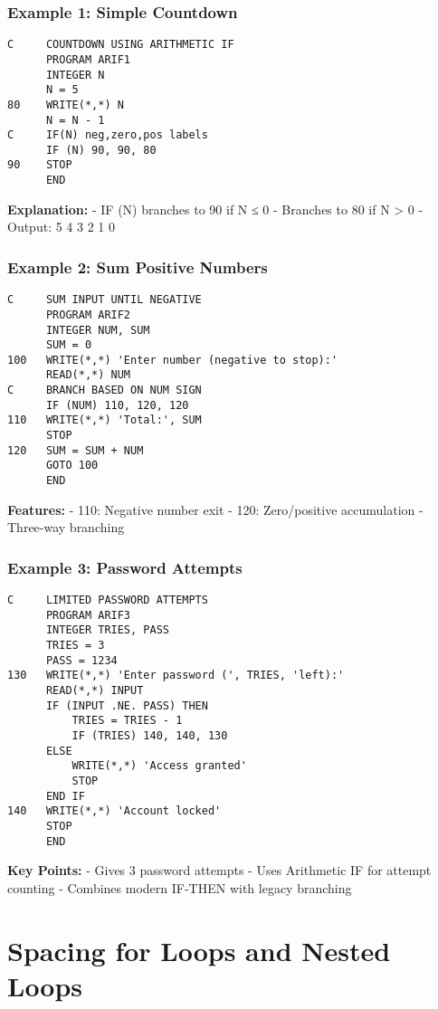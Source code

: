 \documentclass{book}
\begin{document}
\subsubsection*{Example 1: Simple Countdown}
\begin{verbatim}
C     COUNTDOWN USING ARITHMETIC IF
      PROGRAM ARIF1
      INTEGER N
      N = 5
80    WRITE(*,*) N
      N = N - 1
C     IF(N) neg,zero,pos labels
      IF (N) 90, 90, 80
90    STOP
      END
\end{verbatim}
\textbf{Explanation:}
- IF (N) branches to 90 if N ≤ 0
- Branches to 80 if N > 0
- Output: 5 4 3 2 1 0

\subsubsection*{Example 2: Sum Positive Numbers}
\begin{verbatim}
C     SUM INPUT UNTIL NEGATIVE
      PROGRAM ARIF2
      INTEGER NUM, SUM
      SUM = 0
100   WRITE(*,*) 'Enter number (negative to stop):'
      READ(*,*) NUM
C     BRANCH BASED ON NUM SIGN
      IF (NUM) 110, 120, 120
110   WRITE(*,*) 'Total:', SUM
      STOP
120   SUM = SUM + NUM
      GOTO 100
      END
\end{verbatim}
\textbf{Features:}
- 110: Negative number exit
- 120: Zero/positive accumulation
- Three-way branching

\subsubsection*{Example 3: Password Attempts}
\begin{verbatim}
C     LIMITED PASSWORD ATTEMPTS
      PROGRAM ARIF3
      INTEGER TRIES, PASS
      TRIES = 3
      PASS = 1234
130   WRITE(*,*) 'Enter password (', TRIES, 'left):'
      READ(*,*) INPUT
      IF (INPUT .NE. PASS) THEN
          TRIES = TRIES - 1
          IF (TRIES) 140, 140, 130
      ELSE
          WRITE(*,*) 'Access granted'
          STOP
      END IF
140   WRITE(*,*) 'Account locked'
      STOP
      END
\end{verbatim}
\textbf{Key Points:}
- Gives 3 password attempts
- Uses Arithmetic IF for attempt counting
- Combines modern IF-THEN with legacy branching

\section{Spacing for Loops and Nested Loops}
\end{document}
